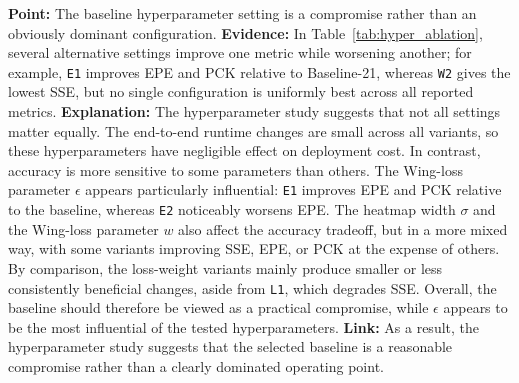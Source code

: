 \documentclass[10pt,letterpaper]{article}
\begin{document}
\medskip
\noindent\textbf{Point:} The baseline hyperparameter setting is a compromise rather than an obviously dominant configuration.  
\textbf{Evidence:} In Table~\ref{tab:hyper_ablation}, several alternative settings improve one metric while worsening another; for example, \texttt{E1} improves EPE and PCK relative to Baseline-21, whereas \texttt{W2} gives the lowest SSE, but no single configuration is uniformly best across all reported metrics.  
\textbf{Explanation:} The hyperparameter study suggests that not all settings matter equally. The end-to-end runtime changes are small across all variants, so these hyperparameters have negligible effect on deployment cost. In contrast, accuracy is more sensitive to some parameters than others. The Wing-loss parameter \(\epsilon\) appears particularly influential: \texttt{E1} improves EPE and PCK relative to the baseline, whereas \texttt{E2} noticeably worsens EPE. The heatmap width \(\sigma\) and the Wing-loss parameter \(w\) also affect the accuracy tradeoff, but in a more mixed way, with some variants improving SSE, EPE, or PCK at the expense of others. By comparison, the loss-weight variants mainly produce smaller or less consistently beneficial changes, aside from \texttt{L1}, which degrades SSE. Overall, the baseline should therefore be viewed as a practical compromise, while \(\epsilon\) appears to be the most influential of the tested hyperparameters.  
\textbf{Link:} As a result, the hyperparameter study suggests that the selected baseline is a reasonable compromise rather than a clearly dominated operating point.
\end{document}
